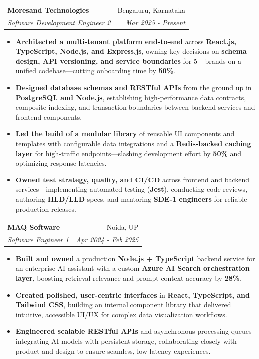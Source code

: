 \documentclass[a4paper,10pt]{article}
\makeatletter
\newcommand{\resumeSubheading}[4]{
  \vspace{-1pt}\item
    \begin{tabular*}{0.97\textwidth}{l@{\extracolsep{\fill}}r}
      \textbf{#1} & #2 \\
      \textit{#3} & \textit{#4} \\
    \end{tabular*}\vspace{-5pt}
}
\newcommand{\resumeItemListStart}{\begin{itemize}}
\newcommand{\resumeItemListEnd}{\end{itemize}\vspace{-5pt}}
\makeatother
\begin{document}
    \resumeSubheading{Moresand Technologies}{Bengaluru, Karnataka}
      {Software Development Engineer 2}{Mar 2025 - Present}
      \resumeItemListStart
        \item \textnormal{\textbf{Architected a multi-tenant platform end-to-end} across \textbf{React.js, TypeScript, Node.js, and Express.js}, owning key decisions on \textbf{schema design, API versioning, and service boundaries} for 5+ brands on a unified codebase---cutting onboarding time by \textbf{50\%}.}
        \item \textnormal{\textbf{Designed database schemas and RESTful APIs} from the ground up in \textbf{PostgreSQL and Node.js}, establishing high-performance data contracts, composite indexing, and transaction boundaries between backend services and frontend components.}
        \item \textnormal{\textbf{Led the build of a modular library} of reusable UI components and templates with configurable data integrations and a \textbf{Redis-backed caching layer} for high-traffic endpoints---slashing development effort by \textbf{50\%} and optimizing response latencies.}
        \item \textnormal{\textbf{Owned test strategy, quality, and CI/CD} across frontend and backend services---implementing automated testing (\textbf{Jest}), conducting code reviews, authoring \textbf{HLD/LLD} specs, and mentoring \textbf{SDE-1 engineers} for reliable production releases.}
      \resumeItemListEnd

    \resumeSubheading{MAQ Software}{Noida, UP}
      {Software Engineer 1}{Apr 2024 - Feb 2025}
      \resumeItemListStart
        \item \textnormal{\textbf{Built and owned} a production \textbf{Node.js + TypeScript} backend service for an enterprise AI assistant with a custom \textbf{Azure AI Search orchestration layer}, boosting retrieval relevance and prompt context accuracy by \textbf{28\%}.}
        \item \textnormal{\textbf{Created polished, user-centric interfaces} in \textbf{React, TypeScript, and Tailwind CSS}, building an internal component library that delivered intuitive, accessible UI/UX for complex data visualization workflows.}
        \item \textnormal{\textbf{Engineered scalable RESTful APIs} and asynchronous processing queues integrating AI models with persistent storage, collaborating closely with product and design to ensure seamless, low-latency experiences.}
      \resumeItemListEnd
\end{document}
